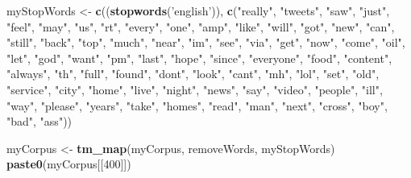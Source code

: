 \documentclass[
]{article}
\newenvironment{Shaded}{\begin{snugshade}}{\end{snugshade}}
\newcommand{\DecValTok}[1]{\textcolor[rgb]{0.00,0.00,0.81}{#1}}
\newcommand{\KeywordTok}[1]{\textcolor[rgb]{0.13,0.29,0.53}{\textbf{#1}}}
\newcommand{\NormalTok}[1]{#1}
\newcommand{\StringTok}[1]{\textcolor[rgb]{0.31,0.60,0.02}{#1}}
\begin{document}
\begin{Shaded}
\begin{Highlighting}[]
\NormalTok{myStopWords <-}\StringTok{ }\KeywordTok{c}\NormalTok{((}\KeywordTok{stopwords}\NormalTok{(}\StringTok{'english'}\NormalTok{)), }
           \KeywordTok{c}\NormalTok{(}\StringTok{"really"}\NormalTok{, }\StringTok{"tweets"}\NormalTok{, }\StringTok{"saw"}\NormalTok{, }\StringTok{"just"}\NormalTok{, }\StringTok{"feel"}\NormalTok{, }\StringTok{"may"}\NormalTok{, }\StringTok{"us"}\NormalTok{, }\StringTok{"rt"}\NormalTok{, }\StringTok{"every"}\NormalTok{, }\StringTok{"one"}\NormalTok{,}
             \StringTok{"amp"}\NormalTok{, }\StringTok{"like"}\NormalTok{, }\StringTok{"will"}\NormalTok{, }\StringTok{"got"}\NormalTok{, }\StringTok{"new"}\NormalTok{, }\StringTok{"can"}\NormalTok{, }\StringTok{"still"}\NormalTok{, }\StringTok{"back"}\NormalTok{, }\StringTok{"top"}\NormalTok{, }\StringTok{"much"}\NormalTok{,}
             \StringTok{"near"}\NormalTok{, }\StringTok{"im"}\NormalTok{, }\StringTok{"see"}\NormalTok{, }\StringTok{"via"}\NormalTok{, }\StringTok{"get"}\NormalTok{, }\StringTok{"now"}\NormalTok{, }\StringTok{"come"}\NormalTok{, }\StringTok{"oil"}\NormalTok{, }\StringTok{"let"}\NormalTok{, }\StringTok{"god"}\NormalTok{, }\StringTok{"want"}\NormalTok{,}
             \StringTok{"pm"}\NormalTok{, }\StringTok{"last"}\NormalTok{, }\StringTok{"hope"}\NormalTok{, }\StringTok{"since"}\NormalTok{, }\StringTok{"everyone"}\NormalTok{, }\StringTok{"food"}\NormalTok{, }\StringTok{"content"}\NormalTok{, }\StringTok{"always"}\NormalTok{, }\StringTok{"th"}\NormalTok{,}
             \StringTok{"full"}\NormalTok{, }\StringTok{"found"}\NormalTok{, }\StringTok{"dont"}\NormalTok{, }\StringTok{"look"}\NormalTok{, }\StringTok{"cant"}\NormalTok{, }\StringTok{"mh"}\NormalTok{, }\StringTok{"lol"}\NormalTok{, }\StringTok{"set"}\NormalTok{, }\StringTok{"old"}\NormalTok{, }\StringTok{"service"}\NormalTok{,}
             \StringTok{"city"}\NormalTok{, }\StringTok{"home"}\NormalTok{, }\StringTok{"live"}\NormalTok{, }\StringTok{"night"}\NormalTok{, }\StringTok{"news"}\NormalTok{, }\StringTok{"say"}\NormalTok{, }\StringTok{"video"}\NormalTok{, }\StringTok{"people"}\NormalTok{, }\StringTok{"ill"}\NormalTok{, }
             \StringTok{"way"}\NormalTok{,  }\StringTok{"please"}\NormalTok{, }\StringTok{"years"}\NormalTok{, }\StringTok{"take"}\NormalTok{, }\StringTok{"homes"}\NormalTok{, }\StringTok{"read"}\NormalTok{, }\StringTok{"man"}\NormalTok{, }\StringTok{"next"}\NormalTok{, }\StringTok{"cross"}\NormalTok{, }
             \StringTok{"boy"}\NormalTok{, }\StringTok{"bad"}\NormalTok{, }\StringTok{"ass"}\NormalTok{))}

\NormalTok{myCorpus <-}\StringTok{ }\KeywordTok{tm_map}\NormalTok{(myCorpus, removeWords, myStopWords) }
\KeywordTok{paste0}\NormalTok{(myCorpus[[}\DecValTok{400}\NormalTok{]])}
\end{Highlighting}
\end{Shaded}
\end{document}
